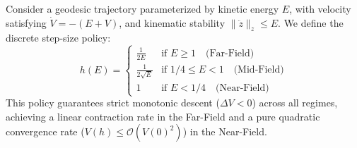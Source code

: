 \begin{theorem}
\label{thm:global_geodesic_step}
Consider a geodesic trajectory parameterized by kinetic energy $E$, with velocity satisfying $\dot{V} = -(E + V)$, and kinematic stability $\|\ddot{z}\|_z \le E$. We define the discrete step-size policy:
\begin{equation}
    h(E) =
    \begin{cases}
        \frac{1}{2E} & \text{if } E \ge 1 \quad \text{(Far-Field)} \\
        \frac{1}{2\sqrt{E}} & \text{if } 1/4 \le E < 1 \quad \text{(Mid-Field)} \\
        1 & \text{if } E < 1/4 \quad \text{(Near-Field)}
    \end{cases}
\end{equation}
This policy guarantees strict monotonic descent ($\Delta V < 0$) across all
regimes, achieving a linear contraction rate in the Far-Field and a pure
quadratic convergence rate ($V(h) \le \mathcal{O}(V(0)^2)$) in the Near-Field.
\end{theorem}

